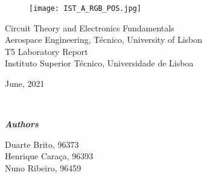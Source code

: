 
\thispagestyle {empty}

\begin{figure}[h!] \centering
	\texttt{[image: IST\_A\_RGB\_POS.jpg]}
\end{figure}



\begin{center}
%



\vspace{1cm}
{\FontLb Circuit Theory and Electronics Fundamentals} \\ %
\vspace{1cm}
{\FontSn Aerospace Engineering, Técnico, University of Lisbon} \\ %
\vspace{1cm}
{\FontSn T5 Laboratory Report} \\
\vspace{1cm}
{\FontSn Instituto Superior Técnico, Universidade de Lisboa} \\ %
\vspace{1cm}

{\FontSn June, 2021} \\ %
\vspace{4cm}

\textbf{\emph{}\\[0.06in]}

\textbf{\emph{Authors}\\[0.05in]}

Duarte Brito, 96373\\
Henrique Caraça, 96393\\
Nuno Ribeiro, 96459\\

\vspace{2cm}
\end{center}

